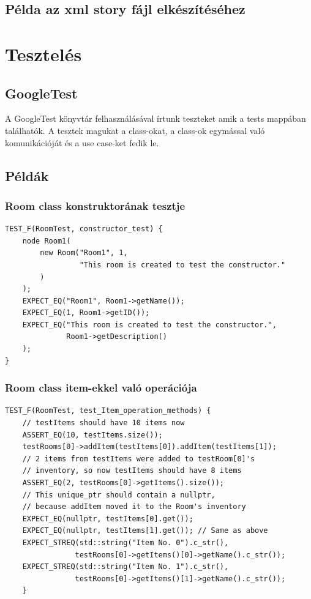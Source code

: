 \documentclass{scrarticle}
\begin{document}
\subsection{Példa az xml story fájl elkészítéséhez}


\newpage
\section{Tesztelés}
\subsection{GoogleTest}
A GoogleTest könyvtár felhasználásával írtunk teszteket amik a tests mappában találhatók. A tesztek magukat a class-okat, a class-ok egymással való komunikációját és a use case-ket fedik le.
\subsection{Példák}
\subsubsection{Room class konstruktorának tesztje}
\begin{lstlisting}
TEST_F(RoomTest, constructor_test) {
    node Room1(
        new Room("Room1", 1, 
                 "This room is created to test the constructor."
        )
    );
    EXPECT_EQ("Room1", Room1->getName());
    EXPECT_EQ(1, Room1->getID());
    EXPECT_EQ("This room is created to test the constructor.", 
              Room1->getDescription()
    );
}
\end{lstlisting}
\subsubsection{Room class item-ekkel való operációja}
\begin{lstlisting}
TEST_F(RoomTest, test_Item_operation_methods) {
    // testItems should have 10 items now
    ASSERT_EQ(10, testItems.size());
    testRooms[0]->addItem(testItems[0]).addItem(testItems[1]);
    // 2 items from testItems were added to testRoom[0]'s 
    // inventory, so now testItems should have 8 items
    ASSERT_EQ(2, testRooms[0]->getItems().size());
    // This unique_ptr should contain a nullptr, 
    // because addItem moved it to the Room's inventory
    EXPECT_EQ(nullptr, testItems[0].get()); 
    EXPECT_EQ(nullptr, testItems[1].get()); // Same as above
    EXPECT_STREQ(std::string("Item No. 0").c_str(), 
                testRooms[0]->getItems()[0]->getName().c_str());
    EXPECT_STREQ(std::string("Item No. 1").c_str(), 
                testRooms[0]->getItems()[1]->getName().c_str());
    }
\end{lstlisting}
\end{document}
